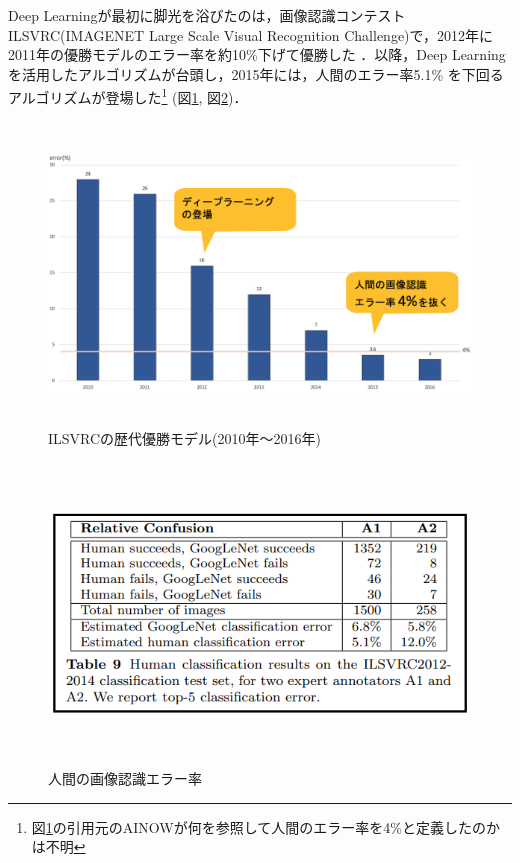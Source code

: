 \documentclass[11pt,a4paper]{jsarticle}
\begin{document}
Deep Learningが最初に脚光を浴びたのは，画像認識コンテスト ILSVRC(IMAGENET Large Scale Visual Recognition Challenge)で，2012年に2011年の優勝モデルのエラー率を約10\%下げて優勝した \cite{dl_hist4}．以降，Deep Learningを活用したアルゴリズムが台頭し，2015年には，人間のエラー率5.1\% \cite{arxiv_ilsvrc}を下回るアルゴリズムが登場した\footnote{図\ref{ilsvrc_winner_2010-2016}の引用元のAINOWが何を参照して人間のエラー率を4\%と定義したのかは不明} (図\ref{ilsvrc_winner_2010-2016}, 図\ref{ilsvrc_human_classification_results})．

\begin{figure} [H]
	\begin{center}
		\includegraphics[clip, height=8cm, bb=0 0 1976 1112]{data/figure/ilsvrc_winner_2010-2016.png}
		\caption{ILSVRCの歴代優勝モデル(2010年～2016年)}
		\label{ilsvrc_winner_2010-2016}
	\end{center}
\end{figure}

\begin{figure} [H]
	\begin{center}
		\includegraphics[clip, height=8cm, bb=-30 0 568 278]{data/figure/ilsvrc_human_classification_results.png}
		\caption{人間の画像認識エラー率}
		\label{ilsvrc_human_classification_results}
	\end{center}
\end{figure}
\end{document}
